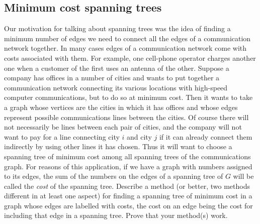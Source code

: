 \subsection{Minimum cost spanning trees}
Our motivation for talking about spanning trees was the idea of finding a
minimum number of edges we need to connect all the edges of a
communication network together.  In many cases edges of a communication
network come with costs associated with them.  For example, one
cell-phone operator charges another one when a customer of the first uses
an antenna of the other.  Suppose a company has offices in a number of
cities and wants to put together a communication network connecting its
various locations with high-speed computer communications, but to do so at
minimum cost.  Then it wants to take a graph whose vertices are the
cities in which it has offices and whose edges represent possible
communications lines between the cities.  Of course there will not
necessarily be lines between each pair of cities, and the company will
not want to pay for a line connecting city $i$ and city $j$ if it can
already connect them indirectly by using other lines it has chosen.  Thus
it will want to choose a spanning tree of minimum cost among all spanning
trees of the communications graph.   For reasons of this application, if
we have a graph with numbers assigned to its edges, the sum of the numbers
on the edges of a spanning tree of
$G$ will be called the {\em cost} of the
spanning tree.  
\bp
\itemi Describe a method (or better, two methods different in at least one
aspect) for finding a spanning tree of minimum cost in a graph whose edges
are labelled with costs, the cost on an edge being the cost for including
that edge in a spanning tree.  Prove that your method(s)
work.\label{mincostspantree}
